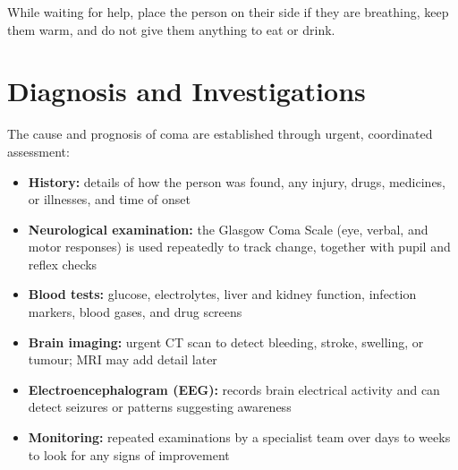 While waiting for help, place the person on their side if they are breathing, keep them warm, and do not give them anything to eat or drink.

\section*{Diagnosis and Investigations}
The cause and prognosis of coma are established through urgent, coordinated assessment:

\begin{itemize}
    \item \textbf{History:} details of how the person was found, any injury, drugs, medicines, or illnesses, and time of onset
    \item \textbf{Neurological examination:} the Glasgow Coma Scale (eye, verbal, and motor responses) is used repeatedly to track change, together with pupil and reflex checks
    \item \textbf{Blood tests:} glucose, electrolytes, liver and kidney function, infection markers, blood gases, and drug screens
    \item \textbf{Brain imaging:} urgent CT scan to detect bleeding, stroke, swelling, or tumour; MRI may add detail later
    \item \textbf{Electroencephalogram (EEG):} records brain electrical activity and can detect seizures or patterns suggesting awareness
    \item \textbf{Monitoring:} repeated examinations by a specialist team over days to weeks to look for any signs of improvement
\end{itemize}

